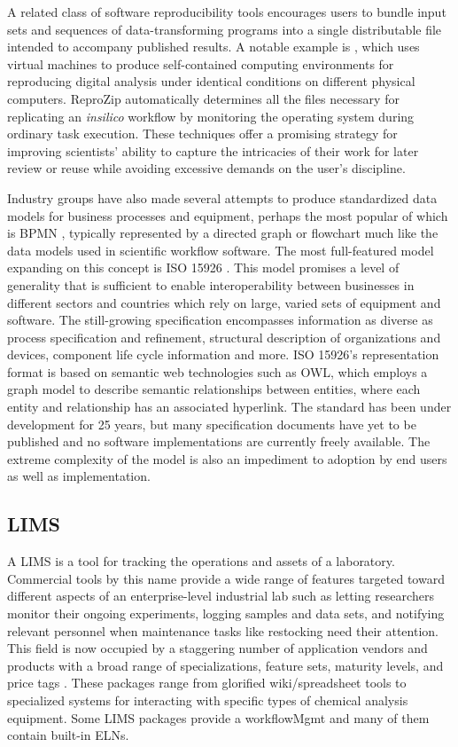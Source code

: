 \documentclass[../thesis]{subfiles}
\begin{document}
A related class of software reproducibility tools encourages users to
bundle input sets and sequences of data-transforming programs into a
single distributable file intended to accompany published results.
A notable example is \cite{ReproZip}, which uses virtual machines to
produce self-contained computing environments for reproducing digital
analysis under identical conditions on different physical
computers. ReproZip automatically determines all the files necessary
for replicating an \textit{\gls{insilico}} workflow by monitoring the operating
system during ordinary task execution. These techniques offer a
promising strategy for improving scientists' ability to capture the
intricacies of their work for later review or reuse while avoiding
excessive demands on the user's discipline.

Industry groups have also made several attempts to produce
standardized data models for business processes and equipment, perhaps
the most popular of which is \gls{BPMN}
\cite{Allweyer:2010:BPM:1841147}, typically represented by a directed
graph or flowchart much like the data models used in scientific
workflow software. The
most full-featured model expanding on this concept is ISO 15926
\cite{West2009}. This model promises
a level of generality that is sufficient to enable interoperability
between businesses in different sectors and countries which rely on
large, varied sets of equipment and software. The still-growing
specification encompasses information as diverse as process
specification and refinement, structural description of organizations
and devices, component life cycle information and more. ISO 15926's
representation format is based on semantic web technologies such as OWL, which
employs a graph model to describe semantic relationships between
entities, where each entity and relationship has an associated
hyperlink. The standard has been under development for 25 years, but
many specification documents have yet to be published and no software
implementations are currently freely available. The extreme complexity
of the model is also an impediment to adoption by end users as well as
implementation.



\subsection{\Gls{LIMS}}
A \gls{LIMS} is a tool for tracking the operations and assets
of a laboratory. Commercial tools by this name provide a wide range
of features targeted toward different aspects of an enterprise-level
industrial lab such as letting researchers monitor their ongoing
experiments, logging samples and data sets, and notifying relevant
personnel when maintenance tasks like restocking need their
attention. This field is now occupied by a staggering number of
application vendors and products with a broad range of
specializations, feature sets, maturity levels, and price tags
\cite{LIMSWikiList}. These packages range from glorified
wiki/spreadsheet tools to specialized systems for interacting with
specific types of chemical analysis equipment.
Some \gls{LIMS} packages provide a \gls{workflowMgmt}
and many of them contain built-in \gls{ELN}s.
\end{document}
